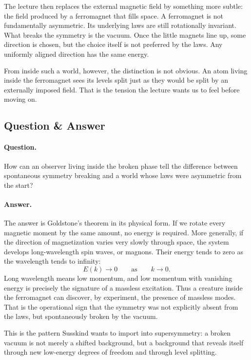 The lecture then replaces the external magnetic field by something more subtle: the field produced by a ferromagnet that fills space. A ferromagnet is not fundamentally asymmetric. Its underlying laws are still rotationally invariant. What breaks the symmetry is the vacuum. Once the little magnets line up, some direction is chosen, but the choice itself is not preferred by the laws. Any uniformly aligned direction has the same energy.

From inside such a world, however, the distinction is not obvious. An atom living inside the ferromagnet sees its levels split just as they would be split by an externally imposed field. That is the tension the lecture wants us to feel before moving on.

\subsection{Question \& Answer}

\paragraph{Question.} How can an observer living inside the broken phase tell the difference between spontaneous symmetry breaking and a world whose laws were asymmetric from the start?

\paragraph{Answer.} The answer is Goldstone's theorem in its physical form. If we rotate every magnetic moment by the same amount, no energy is required. More generally, if the direction of magnetization varies very slowly through space, the system develops long-wavelength spin waves, or magnons. Their energy tends to zero as the wavelength tends to infinity:
\begin{equation}
E(k)\to 0 \qquad \text{as} \qquad k\to 0.
\end{equation}
Long wavelength means low momentum, and low momentum with vanishing energy is precisely the signature of a massless excitation. Thus a creature inside the ferromagnet can discover, by experiment, the presence of massless modes. That is the operational sign that the symmetry was not explicitly absent from the laws, but spontaneously broken by the vacuum.

This is the pattern Susskind wants to import into supersymmetry: a broken vacuum is not merely a shifted background, but a background that reveals itself through new low-energy degrees of freedom and through level splitting.

